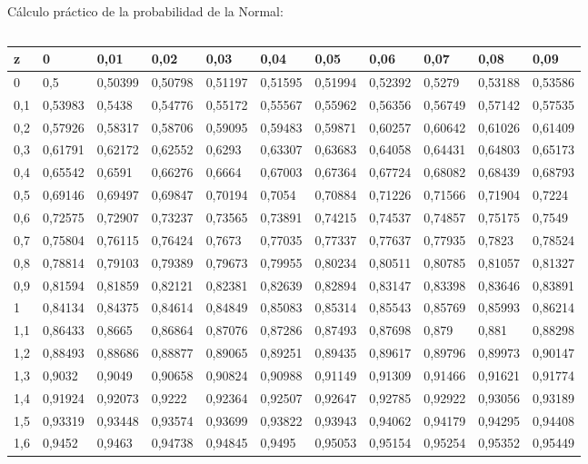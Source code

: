 \documentclass[11pt,handout]{beamer}
\begin{document}
\begin{frame}{Cálculo práctico de la probabilidad de la Normal:}
\begin{columns}
\begin{column}{0.6\textwidth}
{\begin{tabular}{l|llllllllll}
z   & 0       & 0,01    & 0,02    & 0,03    & 0,04    & 0,05    & 0,06    & 0,07    & 0,08    & 0,09    \\
\hline
0   & 0,5     & 0,50399 & 0,50798 & 0,51197 & 0,51595 & 0,51994 & 0,52392 & 0,5279  & 0,53188 & 0,53586 \\
0,1 & 0,53983 & 0,5438  & 0,54776 & 0,55172 & 0,55567 & 0,55962 & 0,56356 & 0,56749 & 0,57142 & 0,57535 \\
0,2 & 0,57926 & 0,58317 & 0,58706 & 0,59095 & 0,59483 & 0,59871 & 0,60257 & 0,60642 & 0,61026 & 0,61409 \\
0,3 & 0,61791 & 0,62172 & 0,62552 & 0,6293  & 0,63307 & 0,63683 & 0,64058 & 0,64431 & 0,64803 & 0,65173 \\
0,4 & 0,65542 & 0,6591  & 0,66276 & 0,6664  & 0,67003 & 0,67364 & 0,67724 & 0,68082 & 0,68439 & 0,68793 \\
0,5 & 0,69146 & 0,69497 & 0,69847 & 0,70194 & 0,7054  & 0,70884 & 0,71226 & 0,71566 & 0,71904 & 0,7224  \\
0,6 & 0,72575 & 0,72907 & 0,73237 & 0,73565 & 0,73891 & 0,74215 & 0,74537 & 0,74857 & 0,75175 & 0,7549  \\
0,7 & 0,75804 & 0,76115 & 0,76424 & 0,7673  & 0,77035 & 0,77337 & 0,77637 & 0,77935 & 0,7823  & 0,78524 \\
0,8 & 0,78814 & 0,79103 & 0,79389 & 0,79673 & 0,79955 & 0,80234 & 0,80511 & 0,80785 & 0,81057 & 0,81327 \\
0,9 & 0,81594 & 0,81859 & 0,82121 & 0,82381 & 0,82639 & 0,82894 & 0,83147 & 0,83398 & 0,83646 & 0,83891 \\
1   & 0,84134 & 0,84375 & 0,84614 & 0,84849 & 0,85083 & 0,85314 & 0,85543 & 0,85769 & 0,85993 & 0,86214 \\
1,1 & 0,86433 & 0,8665  & 0,86864 & 0,87076 & 0,87286 & 0,87493 & 0,87698 & 0,879   & 0,881   & 0,88298 \\
1,2 & 0,88493 & 0,88686 & 0,88877 & 0,89065 & 0,89251 & 0,89435 & 0,89617 & 0,89796 & 0,89973 & 0,90147 \\
1,3 & 0,9032  & 0,9049  & 0,90658 & 0,90824 & 0,90988 & 0,91149 & 0,91309 & 0,91466 & 0,91621 & 0,91774 \\
1,4 & 0,91924 & 0,92073 & 0,9222  & 0,92364 & 0,92507 & 0,92647 & 0,92785 & 0,92922 & 0,93056 & 0,93189 \\
1,5 & 0,93319 & 0,93448 & 0,93574 & 0,93699 & 0,93822 & 0,93943 & 0,94062 & 0,94179 & 0,94295 & 0,94408 \\
1,6 & 0,9452  & 0,9463  & 0,94738 & 0,94845 & 0,9495  & 0,95053 & 0,95154 & 0,95254 & 0,95352 & 0,95449 \\

\end{tabular}}
\end{column}
\end{columns}
\end{frame}
\end{document}
